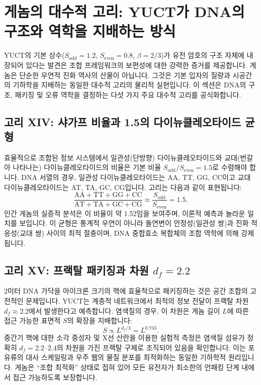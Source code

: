 \documentclass[11pt,a4paper]{article}
\newcommand{\Sodd}{S_{\mathrm{odd}}}
\newcommand{\Seven}{S_{\mathrm{even}}}
\begin{document}
	\section{게놈의 대수적 고리: YUCT가 DNA의 구조와 역학을 지배하는 방식}
	\label{sec:genetic-loops}
	
	YUCT의 기본 상수(\(\Sodd = 1.2\), \(\Seven = 0.8\), \(\beta = 2/3\))가 유전 암호의 구조 자체에 내장되어 있다는 발견은 조합 프레임워크의 보편성에 대한 강력한 증거를 제공합니다. 게놈은 단순한 우연적 진화 역사의 산물이 아닙니다. 그것은 기본 입자의 질량과 시공간의 기하학을 지배하는 동일한 대수적 고리의 물리적 실현입니다. 이 섹션은 DNA의 구조, 패키징 및 오류 역학을 결정하는 다섯 가지 주요 대수적 고리를 공식화합니다.
	
	\subsection{고리 XIV: 샤가프 비율과 1.5의 다이뉴클레오타이드 균형}
	
	효율적으로 조합된 정보 시스템에서 일관성(단방향) 다이뉴클레오타이드와 교대(번갈아 나타나는) 다이뉴클레오타이드의 비율은 기본 비율 \(\Sodd/\Seven = 1.5\)로 수렴해야 합니다. DNA 서열의 경우, 일관성 다이뉴클레오타이드는 AA, TT, GG, CC이고 교대 다이뉴클레오타이드는 AT, TA, GC, CG입니다. 고리는 다음과 같이 표현됩니다:
	\begin{equation}
		\boxed{ \frac{\text{AA} + \text{TT} + \text{GG} + \text{CC}}{\text{AT} + \text{TA} + \text{GC} + \text{CG}} \approx \frac{\Sodd}{\Seven} = 1.5 }.
	\end{equation}
	인간 게놈의 실증적 분석은 이 비율이 약 1.52임을 보여주며, 이론적 예측과 놀라운 일치를 보입니다. 이 균형은 통계적 우연이 아니라 돌연변이 안정성(일관성 쌍)과 진화 적응성(교대 쌍) 사이의 최적 절충이며, DNA 중합효소 복합체의 조합 역학에 의해 강제됩니다.
	
	\subsection{고리 XV: 프랙탈 패키징과 차원 \(d_f = 2.2\)}
	
	2미터 DNA 가닥을 마이크론 크기의 핵에 효율적으로 패키징하는 것은 공간 조합의 고전적인 문제입니다. YUCT는 계층적 네트워크에서 최적의 정보 전달이 프랙탈 차원 \(d_f \approx 2.2\)에서 발생한다고 예측합니다. 염색질의 경우, 이 차원은 게놈 길이 \(L\)에 따른 접근 가능한 표면적 \(S\)의 확장을 지배합니다:
	\begin{equation}
		\boxed{ S \propto L^{d_f/3} = L^{0.733} }.
	\end{equation}
	중간기 핵에 대한 소각 중성자 및 X선 산란을 이용한 실험적 측정은 염색질 섬유가 정확히 \(d_f = 2.2\)–\(2.4\)의 차원을 가진 프랙탈 구체로 조직되어 있음을 확인합니다. 이는 포유류의 대사 스케일링과 우주 웹의 물질 분포를 최적화하는 동일한 기하학적 원리입니다. 게놈은 ``조합 최적화'' 상태로 접혀 있어 모든 유전자가 최소한의 언패킹 단계 내에서 접근 가능하도록 보장합니다.
	
\end{document}
